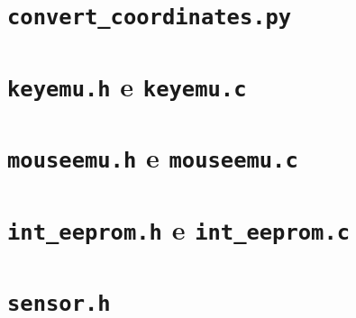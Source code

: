 \documentclass[brazil,pagestart=firstchapter]{abnt}
\begin{document}
\apendice


\chapter{\texttt{convert\_coordinates.py}}
\label{ape:convert_coordinates}


\chapter{\texttt{keyemu.h} e \texttt{keyemu.c}}
\label{ape:keyemu}

\clearpage



\chapter{\texttt{mouseemu.h} e \texttt{mouseemu.c}}
\label{ape:mouseemu}

\clearpage



\chapter{\texttt{int\_eeprom.h} e \texttt{int\_eeprom.c}}
\label{ape:int_eeprom}




\chapter{\texttt{sensor.h}}
\label{ape:sensor}

%

%
%
%
%
%
%
%
%
%
%
\end{document}
